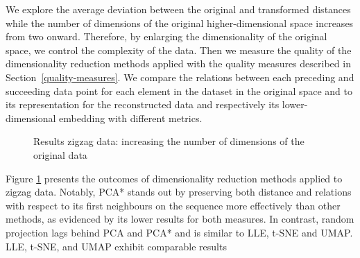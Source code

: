 \documentclass[pdftex,12pt,a4paper]{report}
\begin{document}
We explore the average deviation between the original and transformed distances while the number of dimensions of the original higher-dimensional space increases from two onward.
Therefore, by enlarging the dimensionality of the original space, we control the complexity of the data.
Then we measure the quality of the dimensionality reduction methods applied with the quality measures described in Section~\ref{quality-measures}.
We compare the relations between each preceding and succeeding data point for each element in the dataset in the original space and to its representation for the reconstructed data and respectively its lower-dimensional embedding with different metrics.
\begin{figure}[!htb]
    \caption{Results zigzag data: increasing the number of dimensions of the original data}\label{fig:avg_dev_vs_high_dim-zigzag}
\end{figure}

Figure \ref{fig:avg_dev_vs_high_dim-zigzag} presents the outcomes of dimensionality reduction methods applied to zigzag data.
Notably, PCA* stands out by preserving both distance and relations with respect to its first neighbours on the sequence more effectively than other methods, as evidenced by its lower results for both measures.
In contrast, random projection lags behind PCA and PCA* and is similar to LLE, t-SNE and UMAP.
LLE, t-SNE, and UMAP exhibit comparable results
\end{document}
